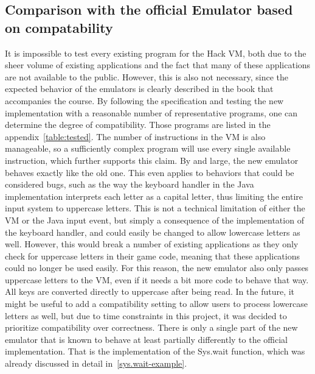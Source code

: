 \subsection{Comparison with the official Emulator based on compatability} \label{compatibility}
It is impossible to test every existing program for the Hack VM, both due to the sheer volume of existing applications and the fact that many of these applications are not available to the public.
However, this is also not necessary, since the expected behavior of the emulators is clearly described in the book that accompanies the course.
By following the specification and testing the new implementation with a reasonable number of representative programs, one can determine the degree of compatibility. Those programs are listed in the appendix~\ref{table:tested}.
The number of instructions in the VM is also manageable, so a sufficiently complex program will use every single available instruction, which further supports this claim.
By and large, the new emulator behaves exactly like the old one. This even applies to behaviors that could be considered bugs, such as the way the keyboard handler in the Java implementation interprets each letter as a capital letter, thus limiting the entire input system to uppercase letters.
This is not a technical limitation of either the VM or the Java input event, but simply a consequence of the implementation of the keyboard handler, and could easily be changed to allow lowercase letters as well.
However, this would break a number of existing applications as they only check for uppercase letters in their game code, meaning that these applications could no longer be used easily.
For this reason, the new emulator also only passes uppercase letters to the VM, even if it needs a bit more code to behave that way. All keys are converted directly to uppercase after being read.
In the future, it might be useful to add a compatibility setting to allow users to process lowercase letters as well, but due to time constraints in this project, it was decided to prioritize compatibility over correctness.
\label{sys.wait-compatibility}
There is only a single part of the new emulator that is known to behave at least partially differently to the official implementation. That is the implementation of the Sys.wait function, which was already discussed in detail in~\cref{sys.wait-example}.


